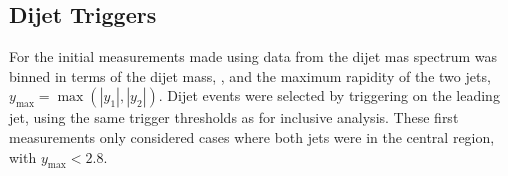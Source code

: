 

\subsection{Dijet Triggers}

For the initial measurements made using data from \atlas \cite{InclusivePaperAtlas1,inclusive_confnote_1} the dijet mas spectrum was binned in terms of the dijet mass, \mass, and the maximum rapidity of the two jets, $y_\mathrm{max} = \max (|y_1|,|y_2|)$. Dijet events were selected by triggering on the leading jet, using the same trigger thresholds as for inclusive analysis. These first measurements only considered cases where both jets were in the central region, with $y_\mathrm{max} < 2.8$.

